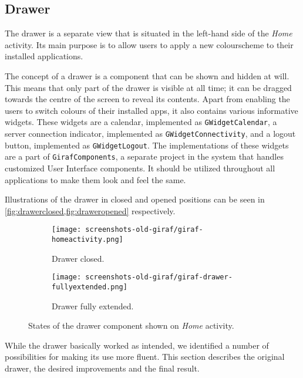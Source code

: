 \subsection{Drawer}\label{sec:launcher:drawer}
The drawer is a separate view that is situated in the left-hand side of the \textit{Home} activity.
Its main purpose is to allow \launcher users to apply a new colourscheme to their installed \giraf applications.

The concept of a drawer is a component that can be shown and hidden at will.
This means that only part of the drawer is visible at all time; it can be dragged towards the centre of the screen to reveal its contents.
Apart from enabling the users to switch colours of their installed \giraf apps, it also contains various informative widgets.
These widgets are a calendar, implemented as \lstinline{GWidgetCalendar}, a server connection indicator, implemented as \lstinline{GWidgetConnectivity}, and a logout button, implemented as \lstinline{GWidgetLogout}.
The implementations of these widgets are a part of \lstinline{GirafComponents}, a separate project in the \giraf system that handles customized User Interface components.
It should be utilized throughout all \giraf applications to make them look and feel the same.

Illustrations of the drawer in closed and opened positions can be seen in \cref{fig:drawerclosed,fig:draweropened} respectively.

\begin{figure}[h] %
\centering
	\begin{subfigure}[b]{.48\textwidth}
	\centering
	\texttt{[image: screenshots-old-giraf/giraf-homeactivity.png]}
	\caption{Drawer closed.}
	\label{fig:drawerclosed}
	\end{subfigure}
	\hfill
	\begin{subfigure}[b]{.48\textwidth}
	\centering
	\texttt{[image: screenshots-old-giraf/giraf-drawer-fullyextended.png]}
	\caption{Drawer fully extended.}
	\label{fig:draweropened}
	\end{subfigure}
\caption{States of the drawer component shown on \textit{Home} activity.}
\label{fig:drawerstates}
\end{figure}

While the drawer basically worked as intended, we identified a number of possibilities for making its use more fluent.
This section describes the original drawer, the desired improvements and the final result.

